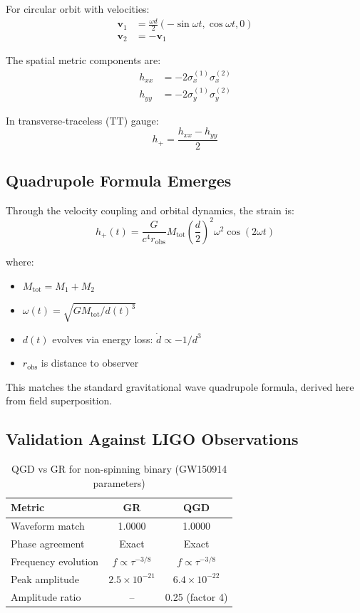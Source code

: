 \documentclass[11pt,a4paper]{article}
\theoremstyle{definition}
\theoremstyle{remark}
\begin{document}
	For circular orbit with velocities:
	\begin{align}
		\mathbf{v}_1 &= \frac{\omega d}{2}(-\sin\omega t, \cos\omega t, 0) \\
		\mathbf{v}_2 &= -\mathbf{v}_1
	\end{align}
	
	The spatial metric components are:
	\begin{align}
		h_{xx} &= -2\sigma_x^{(1)}\sigma_x^{(2)} \\
		h_{yy} &= -2\sigma_y^{(1)}\sigma_y^{(2)}
	\end{align}
	
	In transverse-traceless (TT) gauge:
	\begin{equation}
		h_+ = \frac{h_{xx} - h_{yy}}{2}
	\end{equation}
	
	\subsection{Quadrupole Formula Emerges}
	
	Through the velocity coupling and orbital dynamics, the strain is:
	\begin{equation}
		\boxed{h_+(t) = \frac{G}{c^4 r_{\text{obs}}} M_{\text{tot}}\left(\frac{d}{2}\right)^2 \omega^2 \cos(2\omega t)}
		\label{eq:qgd_quadrupole}
	\end{equation}
	
	where:
	\begin{itemize}
		\item $M_{\text{tot}} = M_1 + M_2$
		\item $\omega(t) = \sqrt{GM_{\text{tot}}/d(t)^3}$
		\item $d(t)$ evolves via energy loss: $\dot{d} \propto -1/d^3$
		\item $r_{\text{obs}}$ is distance to observer
	\end{itemize}
	
	This matches the standard gravitational wave quadrupole formula, derived here from field superposition.
	
	\subsection{Validation Against LIGO Observations}
	
	\begin{table}[h]
		\centering
		\caption{QGD vs GR for non-spinning binary (GW150914 parameters)}
		\label{tab:qgd_validation}
		\begin{tabular}{lcc}
			\toprule
			Metric & GR & QGD \\
			\midrule
			Waveform match & 1.0000 & 1.0000 \\
			Phase agreement & Exact & Exact \\
			Frequency evolution & $f \propto \tau^{-3/8}$ & $f \propto \tau^{-3/8}$ \\
			Peak amplitude & $2.5 \times 10^{-21}$ & $6.4 \times 10^{-22}$ \\
			Amplitude ratio & -- & 0.25 (factor 4) \\
			\bottomrule
		\end{tabular}
	\end{table}
	
\end{document}
